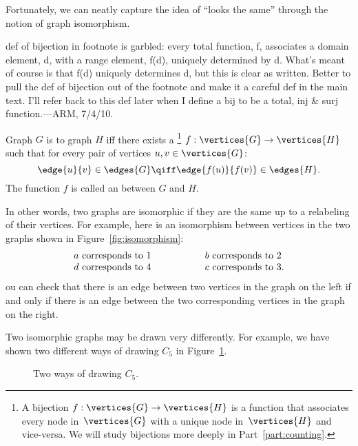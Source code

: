 Fortunately, we can neatly capture the idea of ``looks the same''
through the notion of graph isomorphism.

\begin{editingnotes}
  def of bijection in footnote is garbled: every total function, f,
  associates a domain element, d, with a range element, f(d), uniquely
  determined by d.  What's meant of course is that f(d) uniquely
  determines d, but this is clear as written.  Better to pull the def
  of bijection out of the footnote and make it a careful def in
  the main text.  I'll refer back to this def later when I define a bij to
  be a total, inj \& surj function.---ARM, 7/4/10.
\end{editingnotes}

\begin{definition}\label{simple-isomorphism}
  Graph $G$ is  to graph $H$ iff there exists a
  \footnote{A bijection $f: \vertices{G} \to \vertices{H}$
    is a function that associates every node in~$\vertices{G}$ with a
    unique node in~$\vertices{H}$ and vice-versa.  We will study
    bijections more deeply in Part~\ref{part:counting}.} $f:\vertices{G} \to \vertices{H}$
  such that for every pair of vertices $u, v \in \vertices{G}$:
\[
\edge{u}{v} \in \edges{G} \qiff \edge{f(u)}{f(v)} \in \edges{H}.
\]
The function $f$ is called an  between $G$ and $H$.
\end{definition}

In other words, two graphs are isomorphic if they are the same up to a
relabeling of their vertices.  For example, here is an isomorphism between
vertices in the two graphs shown in Figure~\ref{fig:isomorphism}:
\[
\begin{array}{lll}
a \text{ corresponds to } 1 & \hspace{0.5in} & b \text{ corresponds to } 2 \\
d \text{ corresponds to } 4 & & c \text{ corresponds to } 3.
\end{array}
\]
ou can check that there is an edge between two vertices in the graph
on the left if and only if there is an edge between the two
corresponding vertices in the graph on the right.

Two isomorphic graphs may be drawn very differently.  For example, we
have shown two different ways of drawing $C_5$ in
Figure~\ref{fig:isomorphism-c5}.

\begin{figure}


\caption{Two ways of drawing $C_5$.}
\label{fig:isomorphism-c5}
\end{figure}

